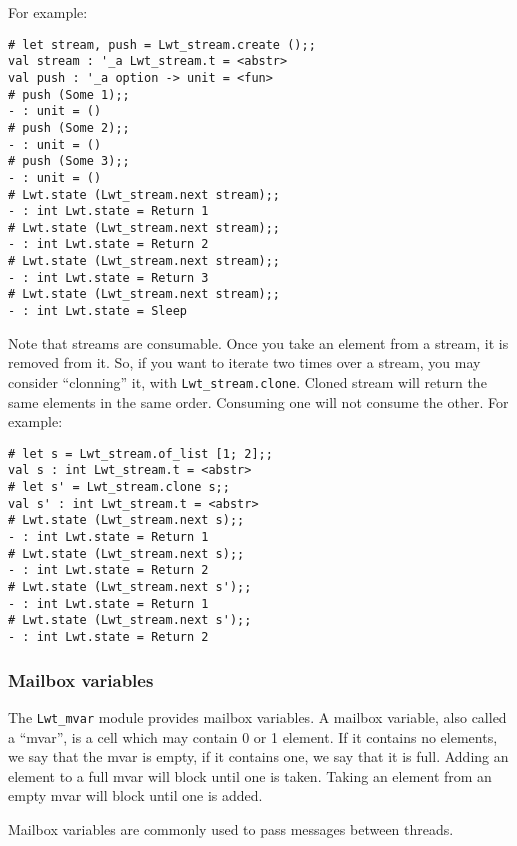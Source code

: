 For example:



\lstset{language=[Objective]Caml}\begin{lstlisting}
# let stream, push = Lwt_stream.create ();;
val stream : '_a Lwt_stream.t = <abstr>
val push : '_a option -> unit = <fun>
# push (Some 1);;
- : unit = ()
# push (Some 2);;
- : unit = ()
# push (Some 3);;
- : unit = ()
# Lwt.state (Lwt_stream.next stream);;
- : int Lwt.state = Return 1
# Lwt.state (Lwt_stream.next stream);;
- : int Lwt.state = Return 2
# Lwt.state (Lwt_stream.next stream);;
- : int Lwt.state = Return 3
# Lwt.state (Lwt_stream.next stream);;
- : int Lwt.state = Sleep
\end{lstlisting}
\medskip

\noindent
Note that streams are consumable. Once you take an element from a
stream, it is removed from it. So, if you want to iterate two times
over a stream, you may consider ``clonning'' it, with
{\tt Lwt\_stream.clone}. Cloned stream will return the same
elements in the same order. Consuming one will not consume the other.
For example:



\lstset{language=[Objective]Caml}\begin{lstlisting}
# let s = Lwt_stream.of_list [1; 2];;
val s : int Lwt_stream.t = <abstr>
# let s' = Lwt_stream.clone s;;
val s' : int Lwt_stream.t = <abstr>
# Lwt.state (Lwt_stream.next s);;
- : int Lwt.state = Return 1
# Lwt.state (Lwt_stream.next s);;
- : int Lwt.state = Return 2
# Lwt.state (Lwt_stream.next s');;
- : int Lwt.state = Return 1
# Lwt.state (Lwt_stream.next s');;
- : int Lwt.state = Return 2
\end{lstlisting}
\medskip

\noindent
\subsubsection{ Mailbox variables }

The {\tt Lwt\_mvar} module provides mailbox variables. A mailbox
variable, also called a ``mvar'', is a cell which may contain 0 or 1
element. If it contains no elements, we say that the mvar is empty,
if it contains one, we say that it is full. Adding an element to a
full mvar will block until one is taken. Taking an element from an
empty mvar will block until one is added.



Mailbox variables are commonly used to pass messages between threads.




